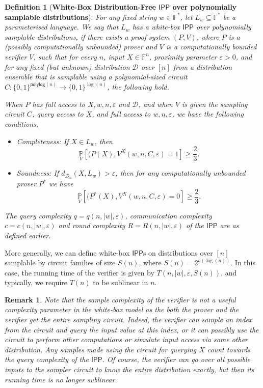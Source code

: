 \documentclass[10pt,a4paper]{article}
\newtheorem{definition}{Definition}[section]
\newtheorem{remark}{Remark}
\newcommand{\polylog}{\mathsf{polylog}}
\newcommand{\IPP}{\mathsf{IPP}}
\newcommand{\F}{\mathbb{F}}
\newcommand{\sD}{\mathcal{D}}
\begin{document}
\begin{definition}[\textbf{White-Box Distribution-Free $\IPP$ over polynomially samplable distributions}]
\label{def:whitebox_df_ipp}
For any fixed string $w \in \F^*$, let $L_w \subseteq \F^*$ be a parameterised language. We say that $L_w$ has a white-box $\IPP$ over polynomially samplable distributions, if there exists a proof system $(P,V)$, where $P$ is a (possibly computationally unbounded) prover and $V$ is a computationally bounded verifier $V$, such that for every $n$, input $X \in \F^n$, proximity parameter $\varepsilon > 0$, and for any fixed (but unknown) distribution $\sD$ over $[n]$ from a distribution ensemble that is samplable using a polynomial-sized circuit $C : \{0,1\}^{\polylog(n)} \rightarrow \{0,1\}^{\log (n)}$, the following hold. 

When $P$ has full access to $X,w,n,\varepsilon$ and $\sD$, and when $V$ is given the sampling circuit $C$, query access to $X$, and full access to $w,n,\varepsilon$, we have the following conditions.
\begin{itemize}
   \item Completeness: If $X \in L_w$, then
    \begin{equation*}
        \underset{V}{\mathbb{P}}\left[(P(X),V^{X}(w,n,C,\varepsilon) = 1 \right] \geq \frac{2}{3}.
    \end{equation*}
    
    \item Soundness: If $d_{\sD_n} (X, L_w)>\varepsilon$, then for any computationally unbounded prover $P^{\ast}$ we have 
    \begin{equation*}
        \underset{V}{\mathbb{P}} \left[(P^{\ast}(X),V^{X}(w,n,C,\varepsilon)=0 \right]\geq \frac{2}{3}.
    \end{equation*}    
\end{itemize}

The query complexity $q = q(n, \vert w \vert, \varepsilon)$, communication complexity $c = c(n, \vert w \vert, \varepsilon)$ and round complexity $R = R(n, \vert w \vert, \varepsilon)$ of the $\IPP$ are as defined earlier. 
\end{definition}
More generally, we can define white-box $\IPP$s on distributions over $[n]$ samplable by circuit families of size $S(n)$, where $S(n) = 2^{o(\log (n))}$. In this case, the running time of the verifier is given by $T(n, \vert w \vert, \varepsilon, S(n))$, and typically, we require $T(n)$ to be sublinear in $n$.

\begin{remark}
Note that the sample complexity of the verifier is not a useful complexity parameter in the white-box model as the both the prover and the verifier get the entire sampling circuit.  Indeed, the verifier can sample an index from the circuit and query the input value at this index, or it can possibly use the circuit to perform other computations or simulate input access via some other distribution. Any samples made using the circuit for querying $X$ count towards the query complexity of the $\IPP$. Of course, the verifier can go over all possible inputs to the sampler circuit to know the entire distribution exactly, but then its running time is no longer sublinear. 
\end{remark}
\end{document}
